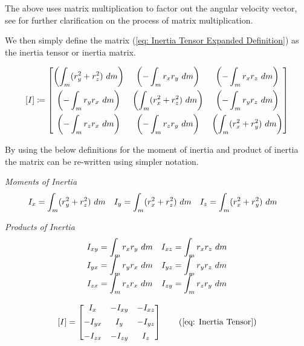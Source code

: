 \documentclass[main.tex]{subfiles}
\begin{document}
                    The above uses matrix multiplication to factor out the angular velocity vector, see  for further clarification on the process of matrix multiplication.

                    We then simply define the matrix (\eqref{eq: Inertia Tensor Expanded Definition}) as the inertia tensor or inertia matrix.

                    \begin{equation}
                        \left[I\right] \coloneqq \begin{bmatrix} \left(\displaystyle \int_m (r_y^2 + r_z^2) \, \, d m\right)& \left(-\displaystyle \int_m r_x r_y \, \, d m\right) & \left(-\displaystyle \int_m r_x r_z \, \, d m\right)\\[1em]
                        \left(-\displaystyle \int_m r_y r_x \, \, d m\right) & \left(\displaystyle \int_m (r_x^2 + r_z^2) \, \, d m\right) & \left(-\displaystyle \int_m r_y r_z \, \, d m\right)\\[1em]
                        \left(-\displaystyle \int_m r_z r_x \, \, d m\right) & \left(-\displaystyle \int_m r_z r_y \, \, d m\right) & \left(\displaystyle \int_m (r_x^2 + r_y^2) \, \, d m\right) \end{bmatrix}
                        \label{eq: Inertia Tensor Expanded Definition}
                    \end{equation}

                    By using the below definitions for the moment of inertia and product of inertia the matrix can be re-written using simpler notation.

                    \textit{Moments of Inertia}
                    \begin{align*}
                        I_x &= \int_m (r_y^2 + r_z^2)\, \, d m  &    I_y &= \int_m (r_x^2 + r_z^2)\, \, d m &   I_z &= \int_m (r_x^2 + r_y^2)\, \, d m
                    \end{align*}

                    \textit{Products of Inertia}
                    \begin{align*}
                        I_{xy} &= \int_m r_x r_y \, \, d m    &   I_{xz} &= \int_m r_x r_z \, \, d m\\[-0.5em]
                        I_{yx} &= \int_m r_y r_x \, \, d m    &   I_{yz} &= \int_m r_y r_z \, \, d m\\[-0.5em]
                        I_{zx} &= \int_m r_z r_x \, \, d m    &   I_{zy} &= \int_m r_z r_y \, \, d m
                    \end{align*}


                    \begin{equation*}
                        \mtrx{I} = \Matrix{I_x & -I_{xy} & -I_{xz}\\[0.5em]
                                            -I_{yx} & I_y & -I_{yz}\\[0.5em]
                                            -I_{zx} & -I_{zy} & I_z}
                        \tag{\eqnum{eq: Inertia Tensor}}
                    \end{equation*}
\end{document}
